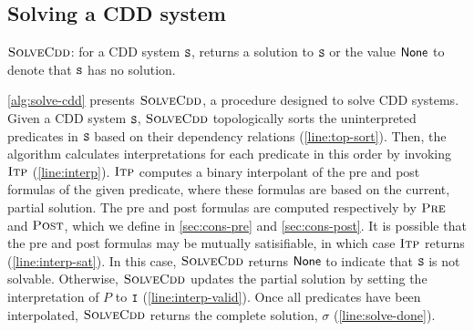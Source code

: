 \subsection{Solving a CDD system}
\label{sec:solve-cdd}

\begin{algorithm}[t]
  \caption{$\textsc{SolveCdd}$: for a CDD system $\cc{S}$, returns a
    solution to $\cc{S}$ or the value $\mathsf{None}$ to denote that
    $\cc{S}$ has no solution.}
  \label{alg:solve-cdd}
\end{algorithm}


\autoref{alg:solve-cdd} presents $\textsc{SolveCdd}$, a procedure designed to solve
CDD systems.
%
Given a CDD system $\cc{S}$, $\textsc{SolveCdd}$ topologically sorts the uninterpreted
predicates in $\cc{S}$ based on their dependency relations
(\autoref{line:top-sort}).
%
Then, the algorithm calculates interpretations for each predicate in this order
by invoking $\textsc{Itp}$ (\autoref{line:interp}).
%
$\textsc{Itp}$ computes a binary interpolant of the pre and post formulas of the
given predicate, where these formulas are based on the current, partial
solution.
%
The pre and post formulas are computed respectively by $\textsc{Pre}$ and
$\textsc{Post}$, which we define in \autoref{sec:cons-pre} and \autoref{sec:cons-post}.
%
It is possible that the pre and post formulas may be mutually
satisifiable, in which case $\textsc{Itp}$ returns 
(\autoref{line:interp-sat}). In this case, $\textsc{SolveCdd}$ returns
$\mathsf{None}$ to indicate that $\cc{S}$ is not solvable.
%
Otherwise, $\textsc{SolveCdd}$ updates the partial solution by setting the
interpretation of $P$ to $\cc{I}$ (\autoref{line:interp-valid}).
%
Once all predicates have been interpolated, $\textsc{SolveCdd}$ returns the complete
solution, $\sigma$ (\autoref{line:solve-done}).


